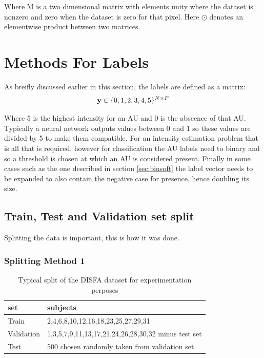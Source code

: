 Where M is a two dimensional matrix with elements unity where the dataset is nonzero
and zero when the dataset is zero for that pixel. Here $\odot$ denotes an elementwise
product between two matrices.

\section{Methods For Labels}

As breifly discussed earlier in this section, the labels are defined as a matrix:
\begin{equation}
  {\bf y} \in \{0,1,2,3,4,5\}^{N\times F}
\end{equation}

Where 5 is the highest intensity for an AU and 0 is the abscence of that AU.
Typically a neural network outputs values between 0 and 1 so these values are divided by 5 to make them compatible.
For an intensity estimation problem that is all that is required, however for classification
the AU labels need to binary and so a threshold is chosen at which an AU is considered present.
Finally in some cases such as the one described in section \ref{sec:binsoft} the label vector
needs to be expanded to also contain the negative case for presence, hence doubling its size.

\subsection{Train, Test and Validation set split}

Splitting the data is important, this is how it was done.
\subsubsection{Splitting Method 1} \label{sec:splitting}
\begin{table}[h!]
  \centering
  \begin{tabular}{|l|l|}
  \hline
  set & subjects   \\
  \hline
   Train          & 2,4,6,8,10,12,16,18,23,25,27,29,31      \\
  \hline
  Validation      & 1,3,5,7,9,11,13,17,21,24,26,28,30,32 minus test set     \\
  \hline
  Test           & 500 chosen randomly taken from validation set      \\
 \hline
  \end{tabular}
  \caption{Typical split of the DISFA dataset for experimentation perposes}
  \label{sec:splitting}
\end{table}
